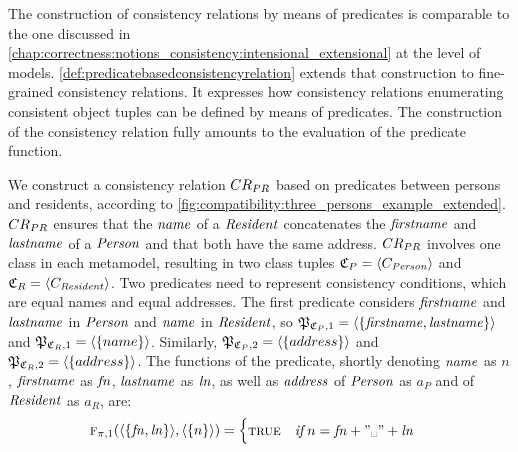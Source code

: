 The construction of consistency relations by means of predicates is comparable to the one discussed in \autoref{chap:correctness:notions_consistency:intensional_extensional} at the level of models.
\autoref{def:predicatebasedconsistencyrelation} extends that construction to fine-grained consistency relations.
It expresses how consistency relations enumerating consistent object tuples can be defined by means of predicates. %
The construction of the consistency relation fully amounts to the evaluation of the predicate function.

\begin{example}
We construct a consistency relation $\consistencyrelation{CR}{PR}$ based on predicates between persons and residents, according to \autoref{fig:compatibility:three_persons_example_extended}. 
$\consistencyrelation{CR}{PR}$ ensures that the $\mathit{name}$ of a $\mathit{Resident}$ concatenates the $\mathit{firstname}$ and $\mathit{lastname}$ of a $\mathit{Person}$ and that both have the same address. 
$\consistencyrelation{CR}{PR}$ involves one class in each metamodel, resulting in two class tuples $\classtuple{C}{P} = \tupled{\class{C}{\mathvariable{Person}}}$ and $\classtuple{C}{R} = \tupled{\class{c}{\mathvariable{Resident}}}$. 
Two predicates need to represent consistency conditions, which are equal names and equal addresses.
The first predicate considers $\mathit{firstname}$ and $\mathit{lastname}$ in $\mathit{Person}$ and $\mathit{name}$ in $\mathit{Resident}$, so $\propertysettuple{P}{\classtuple{C}{P}, 1} = \tupled{\setted{\mathvariable{firstname}, \mathvariable{lastname}}}$ and $\propertysettuple{P}{\classtuple{C}{R}, 1} = \tupled{\setted{name}}$. 
Similarly, $\propertysettuple{P}{\classtuple{C}{P}, 2} = \tupled{\setted{address}}$ and $\propertysettuple{P}{\classtuple{C}{R}, 2} = \tupled{\setted{address}}$.
The functions of the predicate, shortly denoting $\mathit{name}$ as $n$, $\mathit{firstname}$ as $\mathit{fn}$, $\mathit{lastname}$ as $\mathit{ln}$, as well as $\mathit{address}$ of $\mathit{Person}$ as $a_P$ and of $\mathit{Resident}$ as $a_R$, are:
\begin{align*}
   &
   \function{f}_{\pi, 1}(\tupled{\setted{\mathvariable{fn}, \mathvariable{ln}}}, \tupled{\setted{n}}) = \begin{cases} 
      \textsc{true} & \mathtextspaceafter{if} n = \mathvariable{fn} + "\text{\textvisiblespace}" + \mathvariable{ln} \\

\end{cases}
\end{align*}
\end{example}
